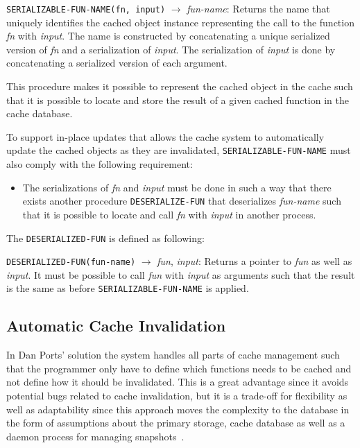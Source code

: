 \verb$SERIALIZABLE-FUN-NAME(fn, input)$ $\rightarrow$ \emph{fun-name}: Returns the name that uniquely identifies the cached object instance representing the call to the function \emph{fn} with \emph{input}. The name is constructed by concatenating a unique serialized version of \emph{fn} and a serialization of \emph{input}. The serialization of \emph{input} is done by concatenating a serialized version of each argument.

This procedure makes it possible to represent the cached object in the cache such that it is possible to locate and store the result of a given cached function in the cache database.

To support in-place updates that allows the cache system to automatically update the cached objects as they are invalidated, \verb$SERIALIZABLE-FUN-NAME$ must also comply with the following requirement:

\begin{itemize}
  \item The serializations of \emph{fn} and \emph{input} must be done in such a way that there exists another procedure \verb$DESERIALIZE-FUN$ that deserializes \emph{fun-name} such that it is possible to locate and call \emph{fn} with \emph{input} in another process.
\end{itemize}

The \verb$DESERIALIZED-FUN$ is defined as following:

\verb$DESERIALIZED-FUN(fun-name)$ $\rightarrow$ \emph{fun}, \emph{input}: Returns a pointer to \emph{fun} as well as \emph{input}. It must be possible to call \emph{fun} with \emph{input} as arguments such that the result is the same as before \verb$SERIALIZABLE-FUN-NAME$ is applied.


\subsection{Automatic Cache Invalidation}
\label{subsec:automatic_cache_invalidation}

In Dan Ports' solution the system handles all parts of cache management such that the programmer only have to define which functions needs to be cached and not define how it should be invalidated. This is a great advantage since it avoids potential bugs related to cache invalidation, but it is a trade-off for flexibility as well as adaptability since this approach moves the complexity to the database in the form of assumptions about the primary storage, cache database as well as a daemon process for managing snapshots~\cite{paper:liskov}.

